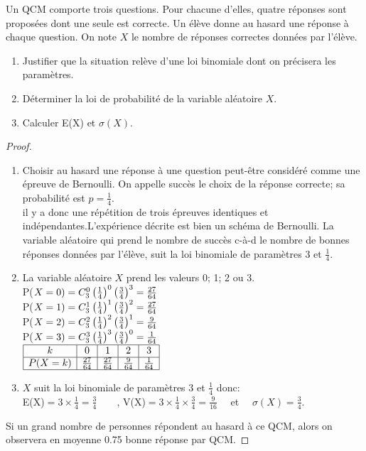 \begin{exercice}
   Un QCM  comporte trois questions. Pour chacune d'elles, quatre réponses sont proposées dont une seule est correcte. Un élève donne au hasard une réponse à chaque question. On note $ X $ le nombre de réponses correctes données par l'élève.
   \begin{enumerate}
   \item Justifier que la situation relève d'une loi binomiale dont on précisera les paramètres.
   \item  Déterminer la loi de probabilité de la variable aléatoire $ X. $
   \item Calculer E(X)  et $\sigma(X)  $.
   \end{enumerate}
\end{exercice}
\begin{proof}
  \begin{enumerate}
  \item Choisir au hasard une réponse à une question peut-être considéré  comme une épreuve de Bernoulli.  On appelle succès le choix de la réponse correcte; sa probabilité est $ p=\frac{1}{4} $.\\ il y a  donc une répétition de trois épreuves identiques et indépendantes.L'expérience   décrite est bien un schéma  de Bernoulli. La variable aléatoire qui prend le nombre de succès c-à-d le nombre de bonnes réponses données par l'élève, suit la loi binomiale  de paramètres $3$ et $ \frac{1}{4}$.
  \item La variable aléatoire $ X$   prend les valeurs 0; 1; 2 ou 3.\\
  P($ X=0)=C_{3}^{0}\left(\frac{1}{4}\right)^{0}\left(\frac{3}{4}\right)^{3}= \frac{27}{64}$\\
   P($ X=1)=C_{3}^{1}\left(\frac{1}{4}\right)^{1}\left(\frac{3}{4}\right)^{2}= \frac{27}{64}$\\
    P($ X=2)=C_{3}^{2}\left(\frac{1}{4}\right)^{2}\left(\frac{3}{4}\right)^{1}= \frac{9}{64}$\\
     P($ X=3)=C_{3}^{3}\left(\frac{1}{4}\right)^{3}\left(\frac{3}{4}\right)^{0}= \frac{1}{64}$\\
 
  
  $ \begin{array}{|c|c|c|c|c|}
\hline
  k  & 0 &1&2&3  \\
 \hline
P(X=k ) &  \frac{27}{64} &  \frac{27}{64}  & \frac{9}{64}  & \frac{1}{64}  \\
\hline
\end{array}$
\item $ X $  suit la loi binomiale  de paramètres $3$ et $ \frac{1}{4}$ donc:\\
E(X)$ =3\times \frac{1}{4}=\frac{3}{4} \quad \quad$, V(X)$ =3\times \frac{1}{4}\times\frac{3}{4}=\frac{9}{16}\quad $ et $\quad \sigma(X)=\frac{3}{4} $.
 \end{enumerate}
 Si un grand nombre de personnes répondent au hasard à ce QCM, alors on observera en moyenne 0.75 bonne réponse par QCM.
 \end{proof}

